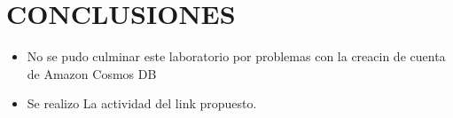\documentclass[12pt,letterpaper]{article}
\begin{document}
\begin{enumerate}
\begin{enumerate}
\begin{enumerate}
	
	
\end{enumerate}
		
	\section{CONCLUSIONES}
	\begin{itemize}
			\item No se pudo culminar este laboratorio por problemas con la creacin de cuenta de Amazon Cosmos DB
			
			\item Se realizo La actividad del link propuesto.
			
		\end{itemize}
		
		
	
\end{document}
